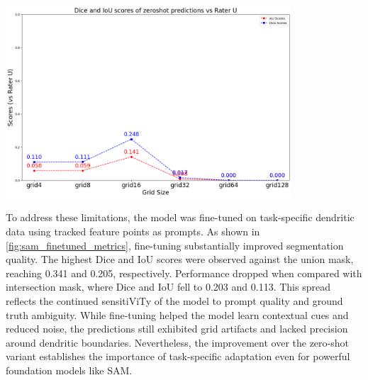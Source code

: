 \begin{center}
\includegraphics[width=0.8\textwidth]{figures/25_sam_zeroshot_metrics.png}
\label{fig:sam_zeroshot_metrics}
\end{center}

To address these limitations, the model was fine-tuned on task-specific dendritic data using tracked feature points as prompts. As shown in \autoref{fig:sam_finetuned_metrics}, fine-tuning substantially improved segmentation quality. The highest Dice and \gls{IoU} scores were observed against the union mask, reaching 0.341 and 0.205, respectively. Performance dropped when compared with intersection mask, where Dice and \gls{IoU} fell to 0.203 and 0.113. This spread reflects the continued sensiti\gls{ViT}y of the model to prompt quality and ground truth ambiguity. While fine-tuning helped the model learn contextual cues and reduced noise, the predictions still exhibited grid artifacts and lacked precision around dendritic boundaries. Nevertheless, the improvement over the zero-shot variant establishes the importance of task-specific adaptation even for powerful foundation models like \gls{SAM}.

